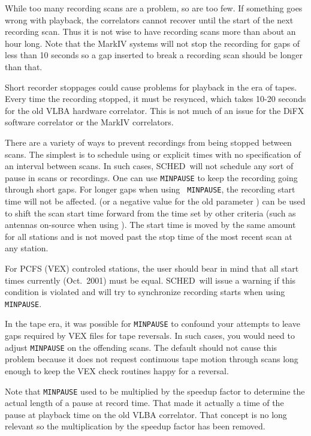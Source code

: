 \documentclass{report}
\newcommand{\schedb}{{\sc SCHED~}}
\begin{document}
While too many recording scans are a problem, so are too few.  If
something goes wrong with playback, the correlators cannot recover
until the start of the next recording scan.  Thus it is not wise to
have recording scans more than about an hour long.  Note that the MarkIV
systems will not stop the recording for gaps of less than 10 seconds
so a gap inserted to break a recording scan should be longer than
that.

Short recorder stoppages could cause problems for playback in the era
of tapes.  Every time the recording stopped, it must be resynced, which
takes 10-20 seconds for the old VLBA hardware correlator.  This is not
much of an issue for the DiFX software correlator or the MarkIV
correlators.

There are a variety of ways to prevent recordings from being stopped
between scans.  The simplest is to schedule using  or explicit times with no specification of an interval
between scans.  In such cases, \schedb will not schedule any sort of
pause in scans or recordings.  One can use {\tt MINPAUSE} to keep the
recording going through short gaps.  For longer gaps when using {\tt
MINPAUSE}, the recording start time will not be affected.   (or a negative value for the old
parameter ) can be used to shift
the scan start time forward from the time set by other criteria (such
as antennas on-source when using ).
The start time is moved by the same amount for all stations and is not
moved past the stop time of the most recent scan at any station.

For PCFS (VEX) controled stations, the user should bear in mind that
all start times currently (Oct.\ 2001) must be equal. \schedb will
issue a warning if this condition is violated and will try to
synchronize recording starts when using {\tt MINPAUSE}.

In the tape era, it was possible for {\tt MINPAUSE} to confound your
attempts to leave gaps required by VEX files for tape reversals.  In
such cases, you would need to adjust {\tt MINPAUSE} on the offending
scans.  The default should not cause this problem because it does not
request continuous tape motion through scans long enough to keep the
VEX check routines happy for a reversal.

Note that {\tt MINPAUSE} used to be multiplied by the speedup factor
to determine the actual length of a pause at record time.  That made
it actually a time of the pause at playback time on the old VLBA
correlator.  That concept is no long relevant so the multiplication
by the speedup factor has been removed.
\end{document}
